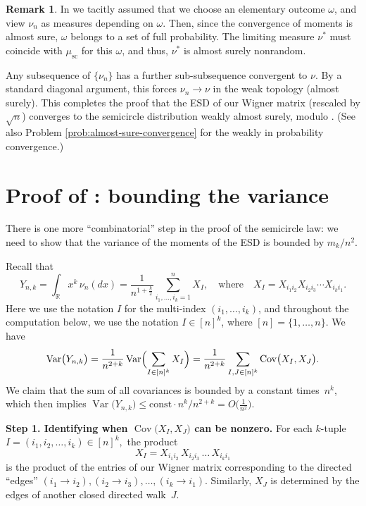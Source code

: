 \documentclass[letterpaper,11pt,oneside,reqno]{article}
\numberwithin{equation}{section}
\theoremstyle{definition}
\newtheorem{remark}[proposition]{Remark}
\begin{document}
\begin{remark}
	In 
	we tacitly assumed that we choose an elementary outcome $\omega$,
	and view $\nu_n$ as measures depending on $\omega$.
	Then, since the convergence of moments is almost sure,
	$\omega$ belongs to a set of full probability.
	The limiting measure $\nu^*$ must coincide
	with $\mu_{\mathrm{sc}}$ for this $\omega$,
	and thus, $\nu^*$ is almost surely nonrandom.
\end{remark}

Any subsequence of \(\{\nu_n\}\) has a further
sub-subsequence convergent to \(\nu\).  By a standard
diagonal argument, this forces \(\nu_n\to\nu\) in the weak
topology (almost surely).  This completes the proof that the ESD of our
Wigner matrix (rescaled by \(\sqrt{n}\)) converges to the
semicircle distribution weakly almost surely,
modulo .
(See also Problem \ref{prob:almost-sure-convergence}
for the weakly in probability convergence.)


\section{Proof of : bounding the variance}
\label{sub:variance-bound-proof}

There is one more ``combinatorial'' step in the proof of the
semicircle law: we need to show that the variance of the
moments of the ESD is bounded by \(m_k/n^2\).

Recall that
\[
	Y_{n,k}
	=\int_{\mathbb{R}}x^k\,\nu_n(dx)
	=\frac{1}{n^{1+\frac{k}{2}}}
	\sum_{i_1,\ldots,i_k=1}^{n} X_I,
	\quad
	\text{where}
	\quad
	X_I=X_{i_1 i_2}X_{i_2 i_3}\cdots X_{i_{k}i_1}.
\]
Here we use the notation $I$ for the multi-index $(i_1,\ldots,i_k)$,
and throughout the computation below,
we use the notation $I\in[n]^k$,
where $[n]=\{1,\ldots,n\}$.
We have
\[
\operatorname{\mathrm{Var}}\bigl(Y_{n,k}\bigr)
	=
	\frac{1}{n^{2+k}}
	\operatorname{\mathrm{Var}}
	\Bigl(\sum_{I\in[n]^k}X_I\Bigr)
	=
	\frac{1}{n^{2+k}}
	\sum_{I,J\in[n]^k}
	\operatorname{\mathrm{Cov}}\bigl(X_I,X_J\bigr).
\]
We claim that the sum of all covariances is bounded by a constant times~\(n^k\), which then implies
\(\operatorname{\mathrm{Var}}\bigl(Y_{n,k}\bigr)\le \mathrm{const}\cdot n^k / n^{2+k}=O\bigl(\tfrac{1}{n^2}\bigr)\).

\medskip

\noindent
\textbf{Step 1. Identifying when \(\operatorname{\mathrm{Cov}}\bigl(X_I,X_J\bigr)\) can be nonzero.}
For each \(k\)-tuple \(I=(i_1,i_2,\dots,i_k)\in[n]^k,\) the product
\[
	X_I = X_{i_1i_2}\,X_{i_2i_3}\,\dots \,X_{i_k i_1}
\]
is the product of the entries of our Wigner matrix corresponding to the directed ``edges''
\((i_1 \to i_2), (i_2 \to i_3),\dots,(i_k \to i_1)\).
Similarly, \(X_J\) is determined by the edges of another closed directed walk~\(J\).
\end{document}
